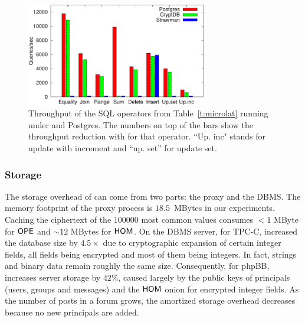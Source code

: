 \begin{figure}[t!] 
\centering
\includegraphics[width=3.1in]{fig/microbars.pdf} 
\vspace{-0.2in}
\caption{Throughput of the SQL operators from Table~\ref{t:microlat}
  running under \name and Postgres. The numbers on top of the bars
  show the throughput reduction with \name{} for that operator. ``Up. inc" stands for update with increment and ``up. set'' for update set.}
\label{fig:microtput}
\end{figure}


\subsubsection{Storage}

The storage overhead of \name can come from two parts: the proxy
and the DBMS\@.
The memory footprint of the \name{} proxy process is
$18.5$~MBytes in our experiments.
Caching the ciphertext of the $100000$ most common values consumes
$<1$ MByte for $\mathsf{OPE}$ and $\sim 12$ MBytes for $\mathsf{HOM}$.  On the DBMS
server, for TPC-C, \name{} increased the database size by $4.5\times$
due to cryptographic expansion of certain integer fields, all fields being encrypted and most of them being integers. In fact, strings and
binary data remain roughly the same size. Consequently,
for phpBB, \name{} increases server storage by $42\%$, caused largely
by the public keys of principals (users, groups and messages) and the
$\mathsf{HOM}$ onion for encrypted integer fields.
As the number of posts in a forum grows, the amortized storage overhead
decreases because no new principals are added.


